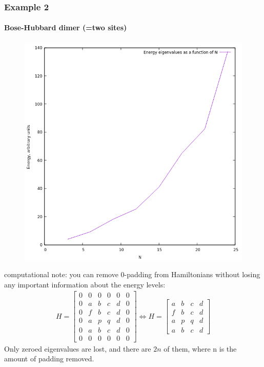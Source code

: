 \documentclass{beamer}
\begin{document}
\begin{frame}
\frametitle{Example 2}
\framesubtitle{Bose-Hubbard dimer (=two sites)}
\begin{figure}
\includegraphics[scale=0.45]{bosehubbard.png}
\end{figure}
\end{frame}
\begin{frame}[fragile]
computational note: you can remove 0-padding from Hamiltonians without losing any important information about the energy levels:
\begin{align}
H = \begin{bmatrix}
0 & 0 & 0 & 0 & 0 & 0\\
0 & a & b & c & d & 0\\
0 & f & b & c & d & 0\\
0 & a & p & q & d & 0\\
0 & a & b & c & d & 0\\
0 & 0 & 0 & 0 & 0 & 0
\end{bmatrix}\iff H = \begin{bmatrix}
a & b & c & d\\
f & b & c & d\\
a & p & q & d\\
a & b & c & d
\end{bmatrix}
\end{align}
Only zeroed eigenvalues are lost, and there are $2n$ of them, where n is the amount of padding removed.
\end{frame}
\end{document}
